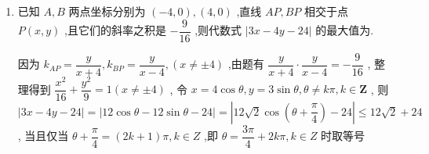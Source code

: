 \begin{enumerate}
\begin{enumerate}
\begin{jieda}
            所以共有 3 个 $P$ 点.
        \end{jieda} 

        \item 已知 $A,B$ 两点坐标分别为 $\left( {-4,0}\right) ,\left( {4,0}\right)$ ,直线 ${AP},{BP}$ 相交于点 $P\left( {x,y}\right)$ ,且它们的斜率之积是 $- \dfrac{9}{16}$ ,则代数式 $\left| {{3x} - {4y} - {24}}\right|$ 的最大值为.
        \begin{jieda}
            因为 ${k}_{AP} = \dfrac{y}{x + 4},{k}_{BP} = \dfrac{y}{x - 4},\left( {x \neq   \pm  4}\right)$ ,由题有 $\dfrac{y}{x + 4} \cdot  \dfrac{y}{x - 4} =  - \dfrac{9}{16}$ ,
            整理得到 $\dfrac{{x}^{2}}{16} + \dfrac{{y}^{2}}{9} = 1\left( {x \neq   \pm  4}\right)$ ,
            令 $x = 4\cos \theta ,y = 3\sin \theta ,\theta  \neq  {k\pi },k \in  \mathbf{Z}$ ,
            则 $\left| {{3x} - {4y} - {24}}\right|  = \left| {{12}\cos \theta  - {12}\sin \theta  - {24}}\right|  = \left| {{12}\sqrt{2}\cos \left( {\theta  + \dfrac{\pi }{4}}\right)  - {24}}\right|  \leq  {12}\sqrt{2} + {24}$ ,
            当且仅当 $\theta  + \dfrac{\pi }{4} = \left( {{2k} + 1}\right) \pi ,k \in  Z$ ,即 $\theta  = \dfrac{3\pi }{4} + {2k\pi },k \in  Z$ 时取等号
        \end{jieda}
        

\end{enumerate}
\end{enumerate}
